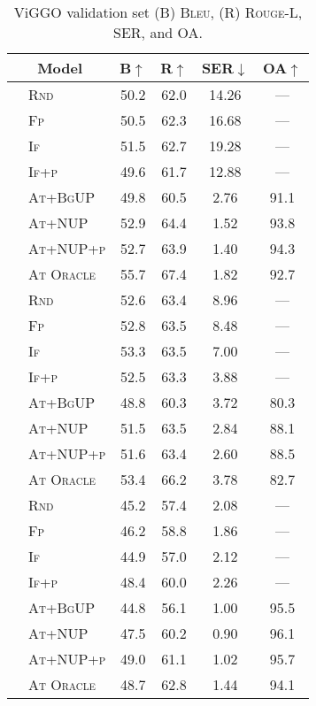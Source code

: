 \begin{table}[t!]
\begin{tabular}{ll cccc}
\toprule
\multicolumn{2}{c}{Model}  &    B$\uparrow$ & R$\uparrow$ & SER$\downarrow$ & OA$\uparrow$    \\
\midrule
\parbox[t]{2mm}{}
 & \textsc{\small{Rnd}} &  50.2&62.0&14.26&--- \\
 & \textsc{\small{Fp}} &  50.5&62.3&16.68&--- \\
 & \textsc{\small{If}} &  51.5&62.7&19.28&--- \\
 & \textsc{\small{If+p}} &  49.6&61.7&12.88&--- \\
 & \textsc{\small{At+BgUP}} &  49.8&60.5&2.76&91.1 \\
 & \textsc{\small{At+NUP}} &  52.9&64.4&1.52&93.8 \\
 & \textsc{\small{At+NUP+p}} &  52.7&63.9&1.40&94.3 \\
 & \textsc{\small{At Oracle}} &  55.7&67.4&1.82&92.7 \\
\midrule
\parbox[t]{2mm}{}
 & \textsc{\small{Rnd}} &  52.6&63.4&8.96&--- \\
 & \textsc{\small{Fp}} &  52.8&63.5&8.48&--- \\
 & \textsc{\small{If}} &  53.3&63.5&7.00&--- \\
 & \textsc{\small{If+p}} &  52.5&63.3&3.88&--- \\
 & \textsc{\small{At+BgUP}} &  48.8&60.3&3.72&80.3 \\
 & \textsc{\small{At+NUP}} &  51.5&63.5&2.84&88.1 \\
 & \textsc{\small{At+NUP+p}} &  51.6&63.4&2.60&88.5 \\
 & \textsc{\small{At Oracle}} &  53.4&66.2&3.78&82.7 \\
\midrule
\parbox[t]{2mm}{}
 & \textsc{\small{Rnd}} &  45.2&57.4&2.08&--- \\
 & \textsc{\small{Fp}} &  46.2&58.8&1.86&--- \\
 & \textsc{\small{If}} &  44.9&57.0&2.12&--- \\
 & \textsc{\small{If+p}} &  48.4&60.0&2.26&--- \\
 & \textsc{\small{At+BgUP}} &  44.8&56.1&1.00&95.5 \\
 & \textsc{\small{At+NUP}} &  47.5&60.2&0.90&96.1 \\
 & \textsc{\small{At+NUP+p}} &  49.0&61.1&1.02&95.7 \\
 & \textsc{\small{At Oracle}} &  48.7&62.8&1.44&94.1 \\
\bottomrule
\end{tabular}


    \caption{ViGGO validation set (B) \textsc{Bleu}, (R) \textsc{Rouge-L},
    SER, and OA.}
    \label{tab:app.viggo.valid.agg}
\end{table}

